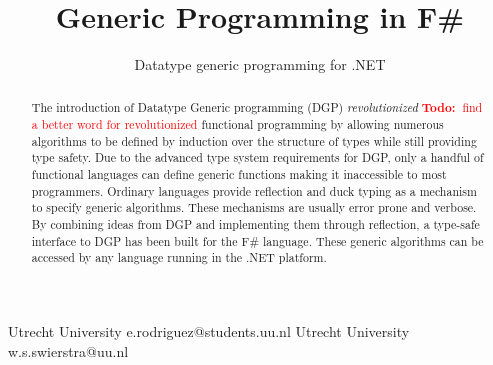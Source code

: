 \documentclass{sigplanconf}
\newcommand{\todo}[1]{
\ifthenelse
  {\boolean{showNotes}}
  {\textcolor{red}{\textbf{Todo:~}#1}}
  {}}
\begin{document}
\setlength{\pdfpageheight}{\paperheight}
\setlength{\pdfpagewidth}{\paperwidth}






\title{Generic Programming in F\#}
\subtitle{Datatype generic programming for .NET}

           {Utrecht University}
           {e.rodriguez@students.uu.nl}
           {Utrecht University}
           {w.s.swierstra@uu.nl}

\newcommand{\Sum}{\mathtt{Sum}}
\newcommand{\Prod}{\mathtt{Prod}}
\newcommand{\Meta}{\mathtt{Meta}}
\newcommand{\K}{\mathtt{K}}
\newcommand{\Id}{\mathtt{Id}}

\maketitle

\begin{abstract}
  The introduction of Datatype Generic programming (DGP)
  \emph{revolutionized} \todo{find a better word for revolutionized}
  functional programming by allowing numerous
  algorithms to be defined by induction over the structure of types
  while still providing type safety. Due to the advanced type system
  requirements for DGP, only a handful of functional languages can
  define generic functions making it inaccessible to most
  programmers. Ordinary languages provide reflection and duck typing
  as a mechanism to specify generic algorithms. These mechanisms are
  usually error prone and verbose. By combining ideas from DGP and
  implementing them through reflection, a type-safe interface to DGP
  has been built for the F\# language. These generic algorithms can be
  accessed by any language running in the .NET platform.
\end{abstract}
\end{document}
